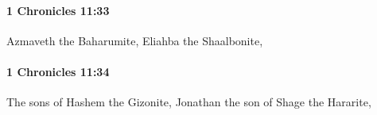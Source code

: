 		\paragraph{1 Chronicles 11:33} %
			\label{1CHRONICLES-11-33}

			Azmaveth the Baharumite, Eliahba the Shaalbonite,


		\paragraph{1 Chronicles 11:34} %
			\label{1CHRONICLES-11-34}

			The sons of Hashem the Gizonite, Jonathan the son of Shage the Hararite,



